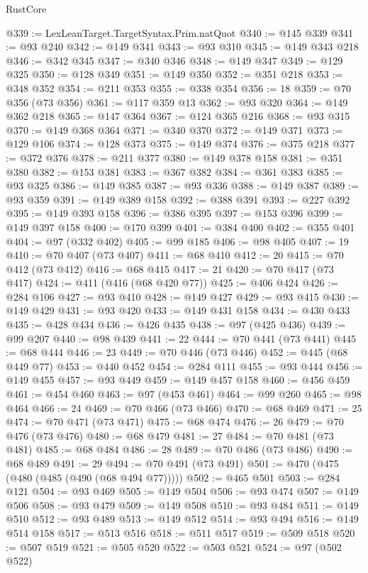 \begin{lexlean}{RustCore}
\begin{coremodule}
@339 := LexLeanTarget.TargetSyntax.Prim.natQuot
@340 := @145 @339
@341 := @93 @240
@342 := @149 @341
@343 := @93 @310
@345 := @149 @343 @218
@346 := @342 @345
@347 := @340 @346
@348 := @149 @347
@349 := @129 @325
@350 := @128 @349
@351 := @149 @350
@352 := @351 @218
@353 := @348 @352
@354 := @211 @353
@355 := @338 @354
@356 := 18
@359 := @70 @356 (@73 @356)
@361 := @117 @359 @13
@362 := @93 @320
@364 := @149 @362 @218
@365 := @147 @364
@367 := @124 @365 @216
@368 := @93 @315
@370 := @149 @368 @364
@371 := @340 @370
@372 := @149 @371
@373 := @129 @106
@374 := @128 @373
@375 := @149 @374
@376 := @375 @218
@377 := @372 @376
@378 := @211 @377
@380 := @149 @378 @158
@381 := @351 @380
@382 := @153 @381
@383 := @367 @382
@384 := @361 @383
@385 := @93 @325
@386 := @149 @385
@387 := @93 @336
@388 := @149 @387
@389 := @93 @359
@391 := @149 @389 @158
@392 := @388 @391
@393 := @227 @392
@395 := @149 @393 @158
@396 := @386 @395
@397 := @153 @396
@399 := @149 @397 @158
@400 := @170 @399
@401 := @384 @400
@402 := @355 @401
@404 := @97 (@332 @402)
@405 := @99 @185
@406 := @98 @405
@407 := 19
@410 := @70 @407 (@73 @407)
@411 := @68 @410
@412 := 20
@415 := @70 @412 (@73 @412)
@416 := @68 @415
@417 := 21
@420 := @70 @417 (@73 @417)
@424 := @411 (@416 (@68 @420 @77))
@425 := @406 @424
@426 := @284 @106
@427 := @93 @410
@428 := @149 @427
@429 := @93 @415
@430 := @149 @429
@431 := @93 @420
@433 := @149 @431 @158
@434 := @430 @433
@435 := @428 @434
@436 := @426 @435
@438 := @97 (@425 @436)
@439 := @99 @207
@440 := @98 @439
@441 := 22
@444 := @70 @441 (@73 @441)
@445 := @68 @444
@446 := 23
@449 := @70 @446 (@73 @446)
@452 := @445 (@68 @449 @77)
@453 := @440 @452
@454 := @284 @111
@455 := @93 @444
@456 := @149 @455
@457 := @93 @449
@459 := @149 @457 @158
@460 := @456 @459
@461 := @454 @460
@463 := @97 (@453 @461)
@464 := @99 @260
@465 := @98 @464
@466 := 24
@469 := @70 @466 (@73 @466)
@470 := @68 @469
@471 := 25
@474 := @70 @471 (@73 @471)
@475 := @68 @474
@476 := 26
@479 := @70 @476 (@73 @476)
@480 := @68 @479
@481 := 27
@484 := @70 @481 (@73 @481)
@485 := @68 @484
@486 := 28
@489 := @70 @486 (@73 @486)
@490 := @68 @489
@491 := 29
@494 := @70 @491 (@73 @491)
@501 := @470 (@475 (@480 (@485 (@490 (@68 @494 @77)))))
@502 := @465 @501
@503 := @284 @121
@504 := @93 @469
@505 := @149 @504
@506 := @93 @474
@507 := @149 @506
@508 := @93 @479
@509 := @149 @508
@510 := @93 @484
@511 := @149 @510
@512 := @93 @489
@513 := @149 @512
@514 := @93 @494
@516 := @149 @514 @158
@517 := @513 @516
@518 := @511 @517
@519 := @509 @518
@520 := @507 @519
@521 := @505 @520
@522 := @503 @521
@524 := @97 (@502 @522)

\end{coremodule}
\end{lexlean}
